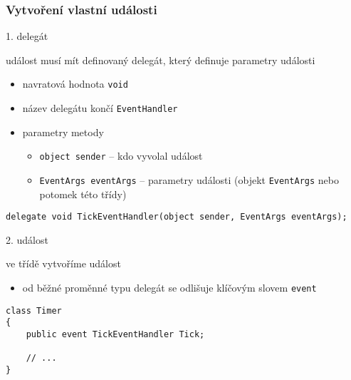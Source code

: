 \begin{frame}[fragile]
\frametitle{Vytvoření vlastní události}
\vfill
\begin{bitemize}{1. delegát}
\item událost musí mít definovaný delegát, který definuje parametry události
\begin{itemize}
\item navratová hodnota \lstinline|void|
\item název delegátu končí \lstinline|EventHandler|
\item parametry metody
\begin{itemize}
\item \lstinline|object sender| -- kdo vyvolal událost
\item \lstinline|EventArgs eventArgs| -- parametry události (objekt \lstinline|EventArgs| nebo potomek této třídy)
\end{itemize}
\end{itemize}
\end{bitemize}
\vfill
\begin{yesblock}
\begin{lstlisting}
delegate void TickEventHandler(object sender, EventArgs eventArgs);
\end{lstlisting}
\end{yesblock}
\vfill
\end{frame}




\begin{frame}[fragile]
\vfill
\begin{bitemize}{2. událost}
\item ve třídě vytvoříme událost
\begin{itemize}
\item od běžné proměnné typu delegát se odlišuje klíčovým slovem \lstinline|event|
\end{itemize}
\end{bitemize}
\vfill
\begin{yesblock}
\begin{lstlisting}
class Timer
{
    public event TickEventHandler Tick;

    // ...
}
\end{lstlisting}
\end{yesblock}
\vfill
\end{frame}




